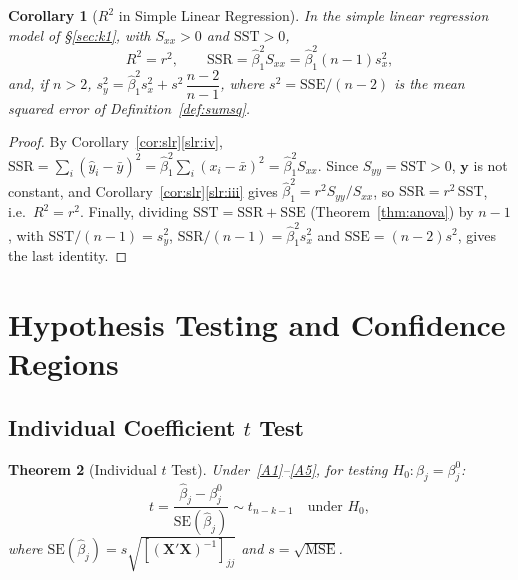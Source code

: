 \documentclass[14pt]{extarticle}
\theoremstyle{plain}
\newtheorem{theorem}{Theorem}[section]
\newtheorem{corollary}[theorem]{Corollary}
\theoremstyle{definition}
\theoremstyle{remark}
\newcommand{\SST}{\mathrm{SST}}
\newcommand{\SSR}{\mathrm{SSR}}
\newcommand{\SSE}{\mathrm{SSE}}
\newcommand{\MSE}{\mathrm{MSE}}
\newcommand{\SE}{\mathrm{SE}}
\newcommand{\bX}{\mathbf{X}}
\newcommand{\by}{\mathbf{y}}
\begin{document}
\begin{corollary}[$R^2$ in Simple Linear Regression]\label{cor:R2-slr}
In the simple linear regression model of \S\ref{sec:k1}, with $S_{xx} > 0$ and $\SST > 0$,
\[
R^2 = r^2, \qquad \SSR = \hat\beta_1^2S_{xx} = \hat\beta_1^2(n-1)s_x^2,
\]
and, if $n > 2$, $s_y^2 = \hat\beta_1^2s_x^2 + s^2\,\dfrac{n-2}{n-1}$, where $s^2 = \SSE/(n-2)$ is the mean squared error of Definition~\ref{def:sumsq}.
\end{corollary}

\begin{proof}
By Corollary~\ref{cor:slr}\ref{slr:iv}, $\SSR = \sum_i(\hat y_i - \bar y)^2 = \hat\beta_1^2\sum_i(x_i - \bar x)^2 = \hat\beta_1^2S_{xx}$. Since $S_{yy} = \SST > 0$, $\by$ is not constant, and Corollary~\ref{cor:slr}\ref{slr:iii} gives $\hat\beta_1^2 = r^2S_{yy}/S_{xx}$, so $\SSR = r^2\,\SST$, i.e.\ $R^2 = r^2$. Finally, dividing $\SST = \SSR + \SSE$ (Theorem~\ref{thm:anova}) by $n - 1$, with $\SST/(n-1) = s_y^2$, $\SSR/(n-1) = \hat\beta_1^2s_x^2$ and $\SSE = (n-2)s^2$, gives the last identity.
\end{proof}

\section{Hypothesis Testing and Confidence Regions}\label{sec:test}

\subsection{Individual Coefficient \texorpdfstring{$t$}{t} Test}

\begin{theorem}[Individual $t$ Test]\label{thm:t-test}
Under~\ref{A1}--\ref{A5}, for testing $H_0\colon \beta_j = \beta_j^0$:
\begin{equation}
t = \frac{\hat{\beta}_j - \beta_j^0}{\SE(\hat{\beta}_j)} \sim t_{n-k-1} \quad \text{under } H_0,
\end{equation}
where $\SE(\hat{\beta}_j) = s\sqrt{[(\bX'\bX)^{-1}]_{jj}}$ and $s = \sqrt{\MSE}$.
\end{theorem}
\end{document}
